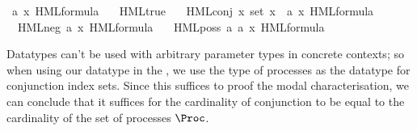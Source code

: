 \begin{isabellebody}
\begin{isamarkuptext}
\end{isamarkuptext}\isamarkuptrue%
\isamarkupfalse%
\ {\isacharparenleft}{\kern0pt}{\isacharprime}{\kern0pt}a{\isacharcomma}{\kern0pt}\ {\isacharprime}{\kern0pt}x{\isacharparenright}{\kern0pt}\ HML{\isacharunderscore}{\kern0pt}formula\ {\isacharequal}{\kern0pt}\isanewline
\ \ HML{\isacharunderscore}{\kern0pt}true\ {\isacharbar}{\kern0pt}\isanewline
\ \ HML{\isacharunderscore}{\kern0pt}conj\ {\isacartoucheopen}{\isacharprime}{\kern0pt}x\ set{\isacartoucheclose}\ {\isacartoucheopen}{\isacharprime}{\kern0pt}x\ {\isasymRightarrow}\ {\isacharparenleft}{\kern0pt}{\isacharprime}{\kern0pt}a{\isacharcomma}{\kern0pt}\ {\isacharprime}{\kern0pt}x{\isacharparenright}{\kern0pt}\ HML{\isacharunderscore}{\kern0pt}formula{\isacartoucheclose}\ {\isacharbar}{\kern0pt}\isanewline
\ \ HML{\isacharunderscore}{\kern0pt}neg\ {\isacartoucheopen}{\isacharparenleft}{\kern0pt}{\isacharprime}{\kern0pt}a{\isacharcomma}{\kern0pt}\ {\isacharprime}{\kern0pt}x{\isacharparenright}{\kern0pt}\ HML{\isacharunderscore}{\kern0pt}formula{\isacartoucheclose}\ {\isacharbar}{\kern0pt}\isanewline
\ \ HML{\isacharunderscore}{\kern0pt}poss\ {\isacartoucheopen}{\isacharprime}{\kern0pt}a{\isacartoucheclose}\ {\isacartoucheopen}{\isacharparenleft}{\kern0pt}{\isacharprime}{\kern0pt}a{\isacharcomma}{\kern0pt}\ {\isacharprime}{\kern0pt}x{\isacharparenright}{\kern0pt}\ HML{\isacharunderscore}{\kern0pt}formula{\isacartoucheclose}%
\isadelimdocument
%
\endisadelimdocument
%
\isatagdocument
%
\isamarkuptrue%
%
\endisatagdocument
{\isafolddocument}%
%
\isadelimdocument
%
\endisadelimdocument
%
\begin{isamarkuptext}%
Datatypes can't be used with arbitrary parameter types  in concrete contexts; so when using our datatype in the , we use the type of processes  as the datatype for conjunction index sets. Since this suffices to proof the modal characterisation, we can conclude that it suffices for the cardinality of conjunction to be equal to the cardinality of the set of processes $\Proc$.


\end{isamarkuptext}
\end{isabellebody}

